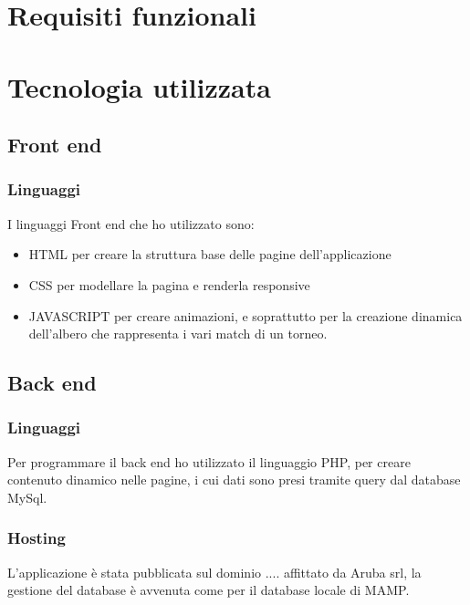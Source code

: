 \documentclass{article}
\begin{document}
\section{Requisiti funzionali}

    \section{Tecnologia utilizzata}
    \subsection{Front end}
    \subsubsection{Linguaggi}
 I linguaggi Front end che ho utilizzato sono:
 \begin{itemize}
    \item HTML per creare la struttura base delle pagine dell'applicazione
    \item CSS per modellare la pagina e renderla responsive 
    \item JAVASCRIPT per creare animazioni, e soprattutto per la creazione dinamica
    dell'albero che rappresenta i vari match di un torneo.
  \end{itemize}
    \subsection{Back end}
    \subsubsection{Linguaggi}
Per programmare il back end ho utilizzato il linguaggio PHP, per creare contenuto
dinamico nelle pagine, i cui dati sono presi tramite query
dal database MySql.
\subsubsection{Hosting}
L'applicazione è stata pubblicata sul dominio .... affittato
da Aruba srl, la gestione del database è avvenuta come per il 
database locale di MAMP.
\end{document}
